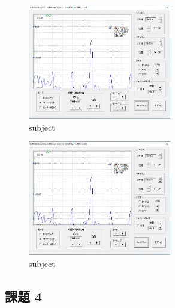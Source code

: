 \documentclass[9pt,a4paper,]{ltjsarticle}
\begin{document}
\begin{figure}
\hypertarget{fig:3k-fft}{%
\centering
\includegraphics[width=\textwidth,height=50mm]{./documents/05/0109-dsPICマイコンプログラミング1/images/3k-fft.png}
\caption{subject}\label{fig:3k-fft}
}
\end{figure}

\begin{figure}
\hypertarget{fig:3k-fft}{%
\centering
\includegraphics[width=\textwidth,height=50mm]{./documents/05/0109-dsPICマイコンプログラミング1/images/3k-fft.png}
\caption{subject}\label{fig:3k-fft}
}
\end{figure}

\clearpage

\hypertarget{ux8ab2ux984c-4}{%
\subsection{課題 4}\label{ux8ab2ux984c-4}}
\end{document}
